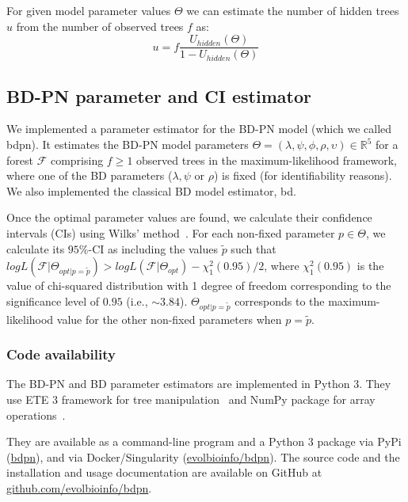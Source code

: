 \documentclass[10pt,letterpaper]{article}
\begin{document}
For given model parameter values $\Theta$ we can estimate the number of hidden trees $u$ from the number of observed trees $f$ as:
\begin{equation}
u = f \frac{U_{hidden}(\Theta)}{1 - U_{hidden}(\Theta)}\label{eq:u} 
\end{equation}


\subsection*{BD-PN parameter and CI estimator}\label{sec:sim}
We implemented a parameter estimator for the BD-PN model (which we called bdpn). It estimates the BD-PN model parameters  $\Theta = (\lambda,\psi,\phi,\rho,\upsilon) \in \mathbb{R}^5$ for a forest $\mathscr{F}$ comprising $f \geq 1$ observed trees in the maximum-likelihood framework, where one of the BD parameters ($\lambda,\psi$ or $\rho$) is fixed (for identifiability reasons). We also implemented the classical BD model estimator, bd.

Once the optimal parameter values are found, we calculate their confidence intervals (CIs) using Wilks' method~\cite{Wilks1938}.
For each non-fixed parameter $p \in \Theta$, we calculate its $95\%$-CI as including the values $\tilde{p}$ such that $log L(\mathscr{F}|\Theta_{opt|p=\tilde{p}}) > log L(\mathscr{F}| \Theta_{opt}) - \chi^2_1(0.95) / 2$, where $\chi^2_1(0.95)$ is the value of chi-squared distribution with 1 degree of freedom corresponding to the significance level of $0.95$ (i.e., $\sim3.84$). $\Theta_{opt|p=\tilde{p}}$ corresponds to the maximum-likelihood value for the other non-fixed parameters when $p = \tilde{p}$. 

\subsubsection*{Code availability}
The BD-PN and BD parameter estimators are implemented in Python 3. They use ETE 3 framework for tree manipulation~\cite{Huerta-Cepas2016} and NumPy package for array operations~\cite{harris_array_2020}. 

They are available as a command-line program and a Python 3 package via PyPi (\href{https://pypi.org/project/bdpn}{bdpn}), and via Docker/Singularity (\href{https://hub.docker.com/r/evolbioinfo/bdpn/tags}{evolbioinfo/bdpn}). The source code and the installation and usage documentation are available on GitHub at \href{https://github.com/evolbioinfo/bdpn}{github.com/evolbioinfo/bdpn}.
\end{document}

